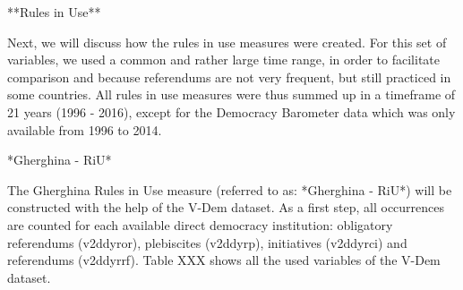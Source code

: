 \documentclass{systats}
\begin{document}
**Rules in Use**

Next, we will discuss how the rules in use measures were created. For this set of variables, we used a common and rather large time range, in order to facilitate comparison and because referendums are not very frequent, but still practiced in some countries. All rules in use measures were thus summed up in a timeframe of 21 years (1996 - 2016), except for the Democracy Barometer data which was only available from 1996 to 2014.  

*Gherghina - RiU*

The Gherghina Rules in Use measure (referred to as: *Gherghina - RiU*) will be constructed with the help of the V-Dem dataset. As a first step, all occurrences are counted for each available direct democracy institution:  obligatory referendums (v2ddyror), plebiscites (v2ddyrp), initiatives (v2ddyrci) and referendums (v2ddyrrf). Table XXX shows all the used variables of the V-Dem dataset.


\begin{table}[]
	\centering
	\caption{My caption}
	\label{my-label}
\end{table}
\end{document}
